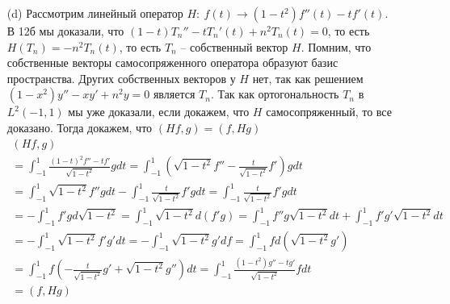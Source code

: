 \begin{enumerate}
\item[(d)]
	Рассмотрим линейный оператор $H:\ f(t) \to (1-t^2)f''(t) - tf'(t)$. В 12б мы доказали, что $(1-t)T_n'' - tT_n'(t) + n^2 T_n(t) = 0$, то есть $H(T_n) = -n^2 T_n(t)$, то есть $T_n$ -- собственный вектор $H$. Помним, что собственные векторы самосопряженного оператора образуют базис пространства. Других собственных векторов у $H$ нет, так как решением $(1-x^2)y'' - xy' + n^2y = 0$ является $T_n$. Так как ортогональность $T_n$ в $L^2(-1,1)$ мы уже доказали, если докажем, что $H$ самосопряженный, то все доказано. Тогда докажем, что $(Hf,g) = (f, Hg)$
	\begin{gather*}
		(Hf, g)\\
		= \int_{-1}^{1} \frac{(1-t)^2 f'' - tf'}{\sqrt{1-t^2}}gdt
		= \int_{-1}^{1} \left( \sqrt{1-t^2}f'' - \frac{t}{\sqrt{1-t^2}}f' \right) gdt\\
		= \int_{-1}^{1} \sqrt{1-t^2}f'' gdt - \int_{-1}^{1} \frac{t}{\sqrt{1-t^2}}f'gdt
		= \int_{-1}^{1} \frac{t}{\sqrt{1-t^2}}f'gdt\\
		= -\int_{-1}^{1} f'gd\sqrt{1-t^2}
		= \int_{-1}^{1} \sqrt{1-t^2} d(f'g)
		= \int_{-1}^{1} f'' g\sqrt{1-t^2}dt + \int_{-1}^{1} f'g'\sqrt{1-t^2}dt\\
		= -\int_{-1}^{1} \sqrt{1-t^2} f'g'dt
		= -\int_{-1}^{1} \sqrt{1-t^2} g'df
		= \int_{-1}^{1} fd(\sqrt{1-t^2}g')\\
		= \int_{-1}^{1} f \left( -\frac{t}{\sqrt{1-t^2}}g' + \sqrt{1-t^2}g'' \right)dt
		= \int_{-1}^{1} \frac{(1-t^2)g'' - tg'}{\sqrt{1-t^2}}fdt\\
		= (f, Hg)
	\end{gather*}
\end{enumerate}
\vskip 0.4in

